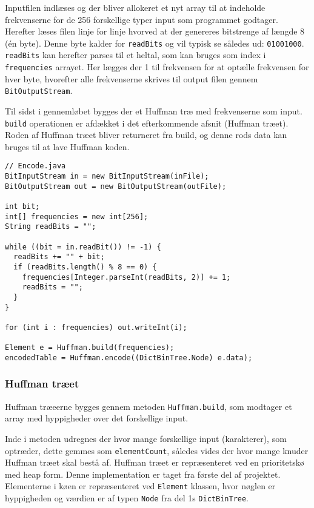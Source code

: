 \documentclass{article}
\begin{document}
Inputfilen indlæses og der bliver allokeret et nyt array til at indeholde frekvenserne for de 256 forskellige typer input som programmet godtager. Herefter læses filen linje for linje hvorved at der genereres bitstrenge af længde 8 (én byte). Denne byte kalder for \texttt{readBits} og vil typisk se således ud: \texttt{01001000}. \texttt{readBits} kan herefter parses til et heltal, som kan bruges som index i \texttt{frequencies} arrayet. Her lægges der 1 til frekvensen for at optælle frekvensen for hver byte, hvorefter alle frekvenserne skrives til output filen gennem \texttt{BitOutputStream}.

Til sidst i gennemløbet bygges der et Huffman træ med frekvenserne som input. \texttt{build} operationen er afdækket i det efterkommende afsnit (Huffman træet).
Roden af Huffman træet bliver returneret fra build, og denne rods data kan bruges til at lave Huffman koden.

\begin{lstlisting}
// Encode.java
BitInputStream in = new BitInputStream(inFile);
BitOutputStream out = new BitOutputStream(outFile);

int bit;
int[] frequencies = new int[256];
String readBits = "";

while ((bit = in.readBit()) != -1) {
  readBits += "" + bit;
  if (readBits.length() % 8 == 0) {
    frequencies[Integer.parseInt(readBits, 2)] += 1;
    readBits = "";
  }
}

for (int i : frequencies) out.writeInt(i);

Element e = Huffman.build(frequencies);
encodedTable = Huffman.encode((DictBinTree.Node) e.data);
\end{lstlisting}

\newpage
\subsubsection*{Huffman træet}
Huffman træeerne bygges gennem metoden \texttt{Huffman.build}, som modtager et array med hyppigheder over det forskellige input.

Inde i metoden udregnes der hvor mange forskellige input (karakterer), som optræder, dette gemmes som \texttt{elementCount}, således vides der hvor mange knuder Huffman træet skal bestå af. Huffman træet er repræsenteret ved en prioritetskø med heap form. Denne implementation er taget fra første del af projektet. Elementerne i køen er repræsenteret ved \texttt{Element} klassen, hvor nøglen er hyppigheden og værdien er af typen \texttt{Node} fra del 1s \texttt{DictBinTree}.
\end{document}
